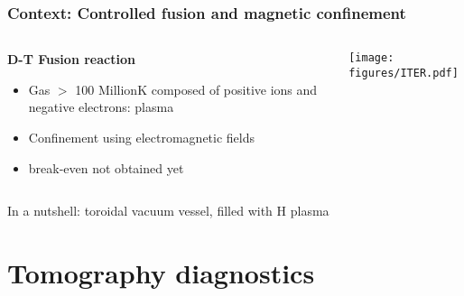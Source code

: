 \documentclass[10pt]{beamer}
\begin{document}
\begin{frame}
\frametitle{Context: Controlled fusion and magnetic confinement}
    
\begin{columns}
    	\begin{column}{0.65\textwidth}
    	    	\begin{center}
		\textbf{D-T Fusion reaction\;\;\;}\vspace{0.3cm}
    		\resizebox{0.5\textwidth}{!}{}       
    		\end{center}
    		\vspace{-0.5cm}
		\begin{itemize}%
    			\item Gas $>$ 100 Million\degree K composed of positive ions and negative electrons: plasma
    			\item Confinement using electromagnetic fields
			\item break-even not obtained yet
		\end{itemize}

    	\end{column}
    	
    	\begin{column}{0.35\textwidth}
	\texttt{[image: figures/ITER.pdf]}
    	\end{column}
    	
\end{columns}

\begin{center}
In a nutshell: toroidal vacuum vessel, filled with H plasma
\end{center}%
\vspace{-0.2cm}
\end{frame}


\section{Tomography diagnostics}
\end{document}
